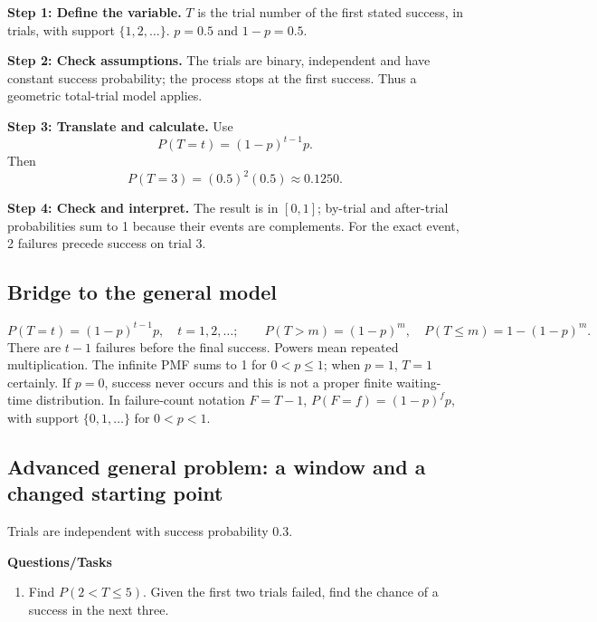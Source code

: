 \par\noindent\begin{minipage}{\linewidth}
\textbf{Step 1: Define the variable.} $T$ is the trial number of the first stated success, in trials, with support $\{1,2,\ldots\}$. $p=0.5$ and $1-p=0.5$.
\end{minipage}\par\medskip
\par\noindent\begin{minipage}{\linewidth}
\textbf{Step 2: Check assumptions.} The trials are binary, independent and have constant success probability; the process stops at the first success. Thus a geometric total-trial model applies.
\end{minipage}\par\medskip
\par\noindent\begin{minipage}{\linewidth}
\textbf{Step 3: Translate and calculate.} Use
\[P(T=t)=(1-p)^{t-1}p.\]
Then
\[P(T=3)=(0.5)^{2}(0.5)\approx 0.1250.\]
\end{minipage}\par\medskip
\par\noindent\begin{minipage}{\linewidth}
\textbf{Step 4: Check and interpret.} The result is in $[0,1]$; by-trial and after-trial probabilities sum to 1 because their events are complements. For the exact event, 2 failures precede success on trial 3. 
\end{minipage}\par\medskip
\subsection{Bridge to the general model}
\[
P(T=t)=(1-p)^{t-1}p,\quad t=1,2,\ldots;\qquad
P(T>m)=(1-p)^m,\quad P(T\leq m)=1-(1-p)^m.
\]
There are $t-1$ failures before the final success. Powers mean repeated multiplication. The infinite PMF sums to 1 for $0<p\leq1$; when $p=1$, $T=1$ certainly. If $p=0$, success never occurs and this is not a proper finite waiting-time distribution. In failure-count notation $F=T-1$, $P(F=f)=(1-p)^fp$, with support $\{0,1,\ldots\}$ for $0<p<1$.
\subsection{Advanced general problem: a window and a changed starting point}
Trials are independent with success probability 0.3.

\textbf{Questions/Tasks}
\begin{enumerate}
\item Find $P(2<T\leq5)$. Given the first two trials failed, find the chance of a success in the next three.
\end{enumerate}
